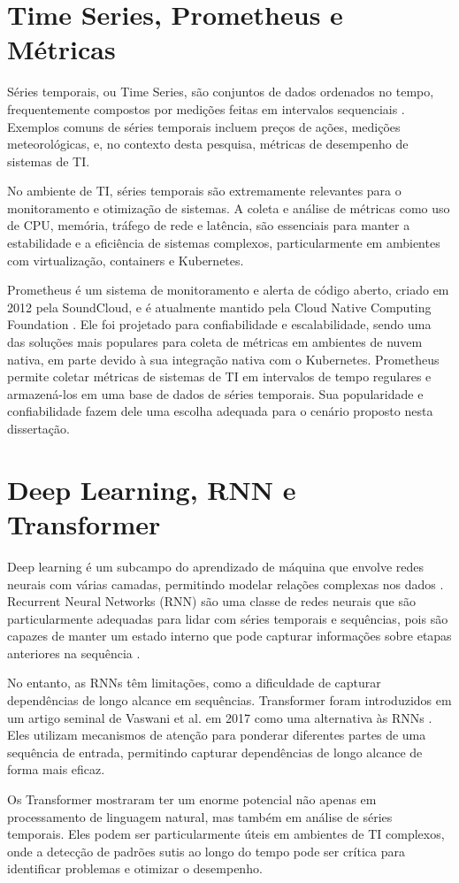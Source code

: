 \section{Time Series, Prometheus e Métricas}

Séries temporais, ou Time Series, são conjuntos de dados ordenados no tempo, frequentemente compostos por medições feitas em intervalos sequenciais \cite{shumway2017time}. Exemplos comuns de séries temporais incluem preços de ações, medições meteorológicas, e, no contexto desta pesquisa, métricas de desempenho de sistemas de TI.

No ambiente de TI, séries temporais são extremamente relevantes para o monitoramento e otimização de sistemas. A coleta e análise de métricas como uso de CPU, memória, tráfego de rede e latência, são essenciais para manter a estabilidade e a eficiência de sistemas complexos, particularmente em ambientes com virtualização, containers e Kubernetes.

Prometheus é um sistema de monitoramento e alerta de código aberto, criado em 2012 pela SoundCloud, e é atualmente mantido pela Cloud Native Computing Foundation \cite{brazil2019prometheus}. Ele foi projetado para confiabilidade e escalabilidade, sendo uma das soluções mais populares para coleta de métricas em ambientes de nuvem nativa, em parte devido à sua integração nativa com o Kubernetes. Prometheus permite coletar métricas de sistemas de TI em intervalos de tempo regulares e armazená-los em uma base de dados de séries temporais. Sua popularidade e confiabilidade fazem dele uma escolha adequada para o cenário proposto nesta dissertação.

\section{Deep Learning, RNN e Transformer}

Deep learning é um subcampo do aprendizado de máquina que envolve redes neurais com várias camadas, permitindo modelar relações complexas nos dados \cite{lecun2015deep}. Recurrent Neural Networks (RNN) são uma classe de redes neurais que são particularmente adequadas para lidar com séries temporais e sequências, pois são capazes de manter um estado interno que pode capturar informações sobre etapas anteriores na sequência \cite{elman1990finding}.

No entanto, as RNNs têm limitações, como a dificuldade de capturar dependências de longo alcance em sequências. Transformer foram introduzidos em um artigo seminal de Vaswani et al. em 2017 como uma alternativa às RNNs \cite{vaswani2017attention}. Eles utilizam mecanismos de atenção para ponderar diferentes partes de uma sequência de entrada, permitindo capturar dependências de longo alcance de forma mais eficaz.

Os Transformer mostraram ter um enorme potencial não apenas em processamento de linguagem natural, mas também em análise de séries temporais. Eles podem ser particularmente úteis em ambientes de TI complexos, onde a detecção de padrões sutis ao longo do tempo pode ser crítica para identificar problemas e otimizar o desempenho.

